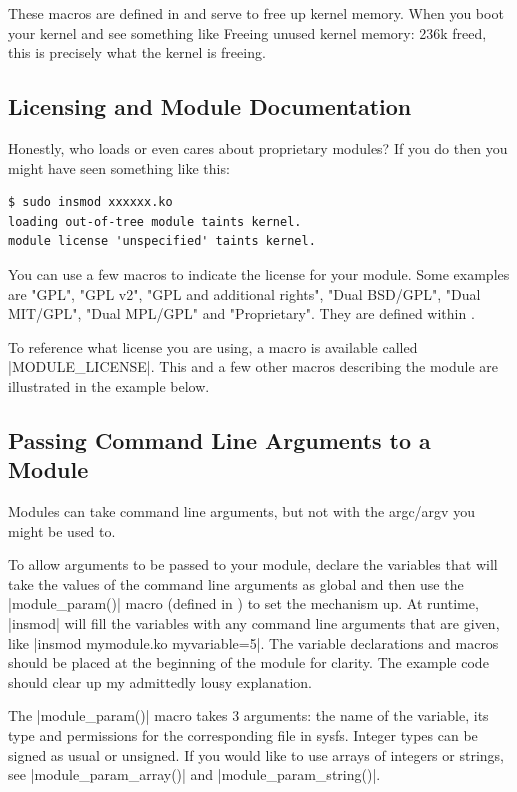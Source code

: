 \documentclass[10pt, oneside]{book}
\begin{document}
These macros are defined in  and serve to free up kernel memory.
When you boot your kernel and see something like Freeing unused kernel memory: 236k freed, this is precisely what the kernel is freeing.


\subsection{Licensing and Module Documentation}
\label{sec:modlicense}
Honestly, who loads or even cares about proprietary modules?
If you do then you might have seen something like this:
\begin{verbatim}
$ sudo insmod xxxxxx.ko
loading out-of-tree module taints kernel.
module license 'unspecified' taints kernel.
\end{verbatim}

You can use a few macros to indicate the license for your module.
Some examples are "GPL", "GPL v2", "GPL and additional rights", "Dual BSD/GPL", "Dual MIT/GPL", "Dual MPL/GPL" and "Proprietary".
They are defined within .

To reference what license you are using, a macro is available called \cpp|MODULE_LICENSE|.
This and a few other macros describing the module are illustrated in the example below.


\subsection{Passing Command Line Arguments to a Module}
\label{sec:modparam}
Modules can take command line arguments, but not with the argc/argv you might be used to.

To allow arguments to be passed to your module, declare the variables that will take the values of the command line arguments as global and then use the \cpp|module_param()| macro (defined in ) to set the mechanism up.
At runtime, \sh|insmod| will fill the variables with any command line arguments that are given, like \sh|insmod mymodule.ko myvariable=5|.
The variable declarations and macros should be placed at the beginning of the module for clarity.
The example code should clear up my admittedly lousy explanation.

The \cpp|module_param()| macro takes 3 arguments: the name of the variable, its type and permissions for the corresponding file in sysfs.
Integer types can be signed as usual or unsigned. If you would like to use arrays of integers or strings,
see \cpp|module_param_array()| and \cpp|module_param_string()|.
\end{document}
